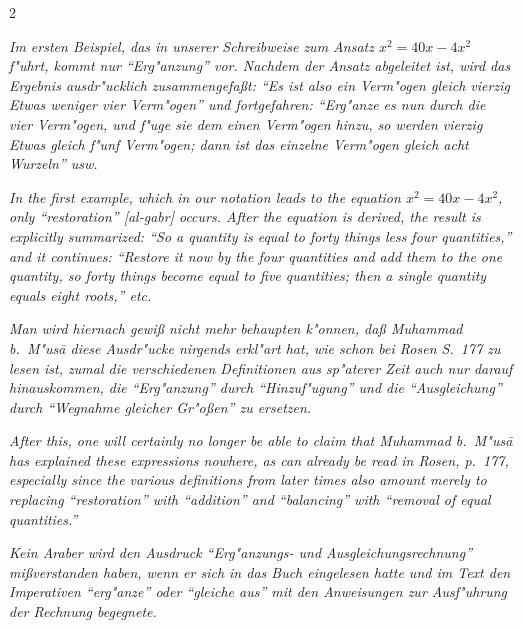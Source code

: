 \documentclass[10pt,a4paper]{article}
\newcommand{\enquote}[1]{``#1''}
\begin{document}
\begin{paracol}{2}
\switchcolumn*

\textit{Im ersten Beispiel, das in unserer Schreibweise zum Ansatz $x^{2} = 40x - 4x^{2}$ f"uhrt, kommt nur \enquote{Erg"anzung} vor. Nachdem der Ansatz abgeleitet ist, wird das Ergebnis ausdr"ucklich zusammengefa\ss{}t: \enquote{Es ist also ein Verm"ogen gleich vierzig Etwas weniger vier Verm"ogen} und fortgefahren: \enquote{Erg"anze es nun durch die vier Verm"ogen, und f"uge sie dem einen Verm"ogen hinzu, so werden vierzig Etwas gleich f"unf Verm"ogen; dann ist das einzelne Verm"ogen gleich acht Wurzeln} usw.}

\switchcolumn

\textit{In the first example, which in our notation leads to the equation $x^{2} = 40x - 4x^{2}$, only \enquote{restoration} [\textit{al-gabr}] occurs. After the equation is derived, the result is explicitly summarized: \enquote{So a quantity is equal to forty things less four quantities,} and it continues: \enquote{Restore it now by the four quantities and add them to the one quantity, so forty things become equal to five quantities; then a single quantity equals eight roots,} etc.}

\switchcolumn*

\textit{Man wird hiernach gewi\ss{} nicht mehr behaupten k"onnen, da\ss{} Muhammad b.\ M"us\=a diese Ausdr"ucke nirgends erkl"art hat, wie schon bei Rosen S.\ 177 zu lesen ist, zumal die verschiedenen Definitionen aus sp"aterer Zeit auch nur darauf hinauskommen, die \enquote{Erg"anzung} durch \enquote{Hinzuf"ugung} und die \enquote{Ausgleichung} durch \enquote{Wegnahme gleicher Gr"o\ss{}en} zu ersetzen.}

\switchcolumn

\textit{After this, one will certainly no longer be able to claim that Muhammad b.\ M"us\=a has explained these expressions nowhere, as can already be read in Rosen, p.\ 177, especially since the various definitions from later times also amount merely to replacing \enquote{restoration} with \enquote{addition} and \enquote{balancing} with \enquote{removal of equal quantities.}}

\switchcolumn*

\textit{Kein Araber wird den Ausdruck \enquote{Erg"anzungs- und Ausgleichungsrechnung} mi\ss{}verstanden haben, wenn er sich in das Buch eingelesen hatte und im Text den Imperativen \enquote{erg"anze} oder \enquote{gleiche aus} mit den Anweisungen zur Ausf"uhrung der Rechnung begegnete.}

\switchcolumn


\end{paracol}
\end{document}
